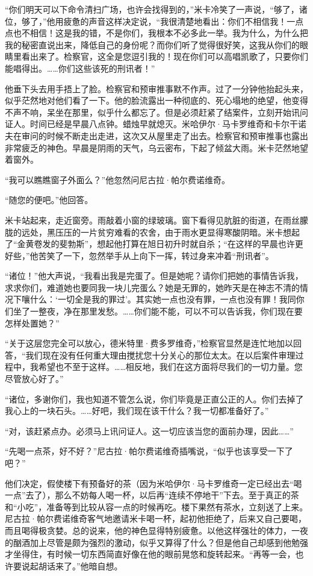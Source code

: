 \par “你们明天可以下命令清扫广场，也许会找得到的，”米卡冷笑了一声说，“够了，诸位，够了，”他用疲惫的声音这样决定说，“我很清楚地看出：你们不相信我！一点点也不相信！这是我的错，不是你们，我根本不必多此一举。我为什么，为什么把我的秘密直说出来，降低自己的身份呢？而你们听了觉得很好笑，这我从你们的眼睛里看出来了。检察官，这全是您逗引我的！现在你们可以高唱凯歌了，只要你们能唱得出。……你们这些该死的刑讯者！”
\par 他垂下头去用手捂上了脸。检察官和预审推事默不作声。过了一分钟他抬起头来，似乎茫然地对他们看了一下。他的脸流露出一种彻底的、死心塌地的绝望，他变得不声不响，呆坐在那里，似乎什么都忘了。但是必须赶紧了结案件，立刻开始讯问证人。时间已经是早晨八点钟。蜡烛早就熄灭。米哈伊尔·马卡罗维奇和卡尔干诺夫在审问的时候不断走出走进，这次又从屋里走了出去。检察官和预审推事也露出非常疲乏的神色。早晨是阴雨的天气，乌云密布，下起了倾盆大雨。米卡茫然地望着窗外。
\par “我可以瞧瞧窗子外面么？”他忽然问尼古拉·帕尔费诺维奇。
\par “随您的便吧。”他回答。
\par 米卡站起来，走近窗旁。雨敲着小窗的绿玻璃。窗下看得见肮脏的街道，在雨丝朦胧的远处，黑压压的一片贫穷难看的农舍，由于雨水更显得寒酸阴暗。米卡想起了“金黄卷发的斐勃斯”，想起他打算在旭日初升时就自杀；“在这样的早晨也许更好些，”他苦笑了一下，忽然举手从上向下一挥，转过身来冲着“刑讯者”。
\par “诸位！”他大声说，“我看出我是完蛋了。但是她呢？请你们把她的事情告诉我，求求你们，难道她也要同我一块儿完蛋么？她是无罪的，她昨天是在神志不清的情况下嚷什么：‘一切全是我的罪过’。其实她一点也没有罪，一点也没有罪！我同你们坐了一整夜，净在那里发愁。……你们能不能，可以不可以告诉我，你们现在要怎样处置她？”
\par “关于这层您完全可以放心，德米特里·费多罗维奇，”检察官显然是连忙地加以回答，“我们现在没有任何重大理由搅扰您十分关心的那位太太。在以后案件审理过程中，我希望也不至于这样。……相反地，我们在这方面将尽我们的一切力量。您尽管放心好了。”
\par “诸位，多谢你们，我也知道不管怎么说，你们毕竟是正直公正的人。你们去掉了我心上的一块石头。……好吧，我们现在该干什么？我一切都准备好了。”
\par “对，该赶紧点办。必须马上讯问证人。这一切应该当您的面前办理，因此……”
\par “先喝一点茶，好不好？”尼古拉·帕尔费诺维奇插嘴说，“似乎也该享受一下了吧？”
\par 他们决定，假使楼下有预备好的茶（因为米哈伊尔·马卡罗维奇一定已经出去“喝一点”去了），那么不妨每人喝一杯，以后再“连续不停地干”下去。至于真正的茶和“小吃”，准备等到比较从容一点的时候再吃。楼下果然有茶水，立刻送了上来。尼古拉·帕尔费诺维奇客气地邀请米卡喝一杯，起初他拒绝了，后来又自己要喝，而且喝得极贪婪。总的说来，他的神色显得特别疲惫。以他这样强壮的体力，一夜的酗酒加上尽管是颇为强烈的激动，似乎又算得了什么？但是他自己却感到他勉强才坐得住，有时候一切东西简直好像在他的眼前晃悠和旋转起来。“再等一会，也许要说起胡话来了。”他暗自想。
